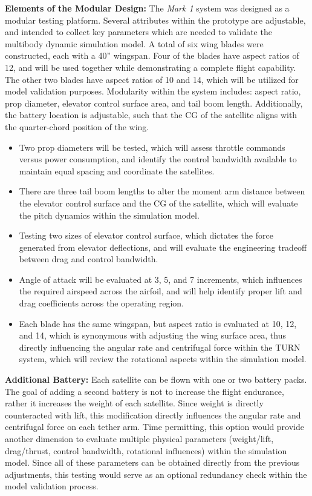 \documentclass[11pt]{article}
\begin{document}
{\bf Elements of the Modular Design:}
The \emph{Mark 1} system was designed as a modular testing platform.  Several attributes within the prototype are adjustable, and intended to collect key parameters which are needed to validate the multibody dynamic simulation model.  A total of six wing blades were constructed, each with a 40'' wingspan.  Four of the blades have aspect ratios of 12, and will be used together while demonstrating a complete flight capability.  The other two blades have aspect ratios of 10 and 14, which will be utilized for model validation purposes.  Modularity within the system includes: aspect ratio, prop diameter, elevator control surface area, and tail boom length.  Additionally, the battery location is adjustable, such that the CG of the satellite aligns with the quarter-chord position of the wing.
\begin{itemize}
\item Two prop diameters will be tested, which will assess throttle commands versus power consumption, and identify the control bandwidth available to maintain equal spacing and coordinate the satellites.
\item There are three tail boom lengths to alter the moment arm distance between the elevator control surface and the CG of the satellite, which will evaluate the pitch dynamics within the simulation model.
\item Testing two sizes of elevator control surface, which dictates the force generated from elevator deflections, and will evaluate the engineering tradeoff between drag and control bandwidth.
\item Angle of attack will be evaluated at 3\degree, 5\degree, and 7\degree{} increments, which influences the required airspeed across the airfoil, and will help identify proper lift and drag coefficients across the operating region.
\item Each blade has the same wingspan, but aspect ratio is evaluated at 10, 12, and 14, which is synonymous with adjusting the wing surface area, thus directly influencing the angular rate and centrifugal force within the TURN system, which will review the rotational aspects within the simulation model.
\end{itemize}


{\bf Additional Battery:}
Each satellite can be flown with one or two battery packs.  The goal of adding a second battery is not to increase the flight endurance, rather it increases the weight of each satellite.  Since weight is directly counteracted with lift, this modification directly influences the angular rate and centrifugal force on each tether arm.  Time permitting, this option would provide another dimension to evaluate multiple physical parameters (weight/lift, drag/thrust, control bandwidth, rotational influences) within the simulation model.  Since all of these parameters can be obtained directly from the previous adjustments, this testing would serve as an optional redundancy check within the model validation process.
\end{document}
